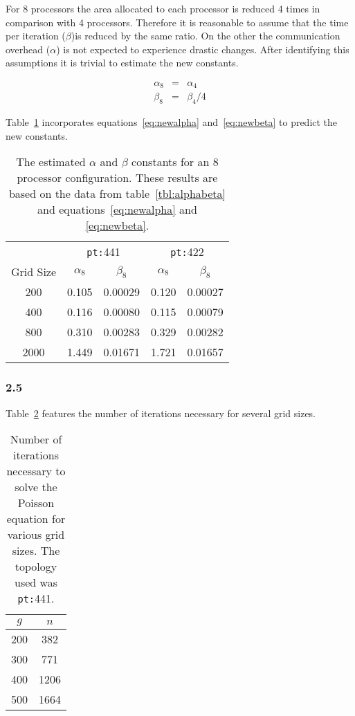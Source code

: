 For 8 processors the area allocated to each processor is reduced 4 times in comparison with 4 processors. Therefore it is reasonable to assume that the time per iteration ($\beta$)is reduced by the same ratio. On the other the communication overhead ($\alpha$) is not expected to experience drastic changes. After identifying this assumptions it is trivial to estimate the new constants.

\begin{eqnarray}
\alpha_8 &=& \alpha_4 \label{eq:newalpha}\\
\beta_8  &=& \beta_4 / 4 \label{eq:newbeta}
\end{eqnarray}

Table~\ref{tbl:newalphabeta} incorporates equations~\ref{eq:newalpha} and~\ref{eq:newbeta} to predict the new constants.

\begin{table}[H]
\centering
\begin{tabular}{*{5}{c}}
 \toprule
            &    \multicolumn{2}{c}{\texttt{pt:}441} & \multicolumn{2}{c}{\texttt{pt:}422} \\
Grid Size   &    $\alpha_8$ &    $\beta_8$           & $\alpha_8$    & $\beta_8$ \\ \midrule
200         &    0.105      &    0.00029             & 0.120         & 0.00027   \\
400         &    0.116      &    0.00080             & 0.115         & 0.00079   \\
800         &    0.310      &    0.00283             & 0.329         & 0.00282   \\
2000        &    1.449      &    0.01671             & 1.721         & 0.01657   \\
\bottomrule
\end{tabular}
\caption{The estimated $\alpha$ and $\beta$ constants for an 8 processor configuration. These results are based on the data from table~\ref{tbl:alphabeta} and equations~\ref{eq:newalpha} and \ref{eq:newbeta}.}
\label{tbl:newalphabeta}
\end{table}

\subsubsection{2.5}

Table~\ref{tbl:iterations} features the number of iterations necessary for several grid sizes.

\begin{table}[H]
\centering
\begin{tabular}{*{2}{c}}
 \toprule
$g$   &    $n$   \\ \midrule
200   &    382   \\
300   &    771   \\
400   &   1206   \\
500   &   1664   \\
\bottomrule
\end{tabular}
\caption{Number of iterations necessary to solve the Poisson equation for various grid sizes. The topology used was \texttt{pt:}441.}
\label{tbl:iterations}
\end{table}

